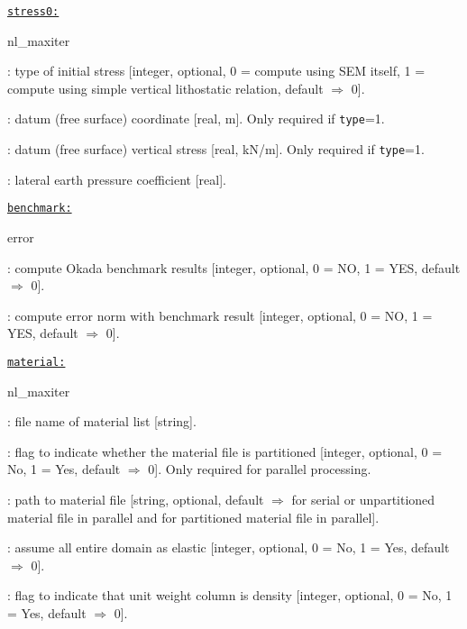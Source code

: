 \texttt{\underline{stress0:}}
\begin{adescription}{nl\_maxiter}
  \item[type]: type of initial stress [integer, optional, 0 = compute using SEM itself, 1 = compute using simple vertical lithostatic relation, default $\Rightarrow$ 0].
  \item[z0]: datum (free surface) coordinate [real, m]. Only required if \texttt{type}=1.
  \item[s0]: datum (free surface) vertical stress [real, kN/m]. Only required if \texttt{type}=1.
  \item[k0]: lateral earth pressure coefficient [real].
  \\
\end{adescription}

\texttt{\underline{benchmark:}}
\begin{adescription}{error}
  \item[okada]: compute Okada benchmark results [integer, optional, 0 = NO, 1 = YES, default $\Rightarrow$ 0].
  \item[error]: compute error norm with benchmark result [integer, optional, 0 = NO, 1 = YES, default $\Rightarrow$ 0].
  \\
\end{adescription}

\texttt{\underline{material:}}
\begin{adescription}{nl\_maxiter}
  \item[matfile]: file name of material list [string].
  \item[ispart]: flag to indicate whether the material file is partitioned [integer, optional, 0 = No, 1 = Yes, default $\Rightarrow$ 0]. Only required for parallel processing.
  \item[matpath]: path to material file [string, optional, default $\Rightarrow$ \texttt{} for serial or unpartitioned material file in parallel and \texttt{} for partitioned material file in parallel].
  \item[allelastic]: assume all entire domain as elastic [integer, optional, 0 = No, 1 = Yes, default $\Rightarrow$ 0].
  \item[density]: flag to indicate that unit weight column is density [integer, optional, 0 = No, 1 = Yes, default $\Rightarrow$ 0].
  \\
\end{adescription}

